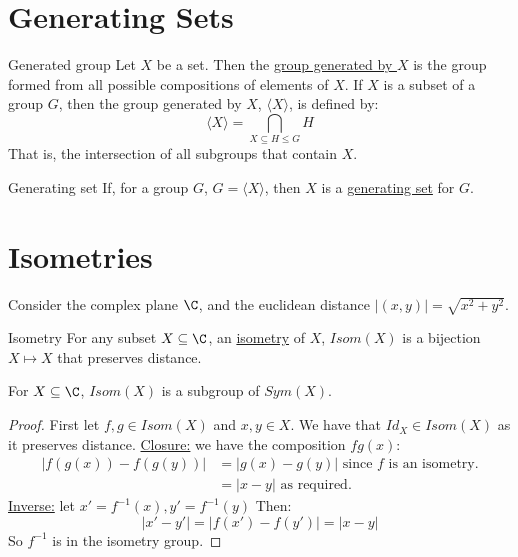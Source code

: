 \documentclass[../Main.tex]{subfiles}
\begin{document}
\section{Generating Sets}
\begin{definition}{Generated group}
    Let $X$ be a set. Then the \underline{group generated by $X$} is the group formed from all possible compositions of elements of $X$. If $X$ is a subset of a group $G$, then the group generated by $X$, $\langle X \rangle$, is defined by:
    \begin{equation*}
        \langle X \rangle = \bigcap_{X \subseteq H \leq G} H
    \end{equation*}
    That is, the intersection of all subgroups that contain $X$.
\end{definition}
\begin{definition}{Generating set}
    If, for a group $G$, $G = \langle X \rangle$, then $X$ is a \underline{generating set} for $G$.
\end{definition}
\section{Isometries}
Consider the complex plane $\C$, and the euclidean distance $|(x, y)| = \sqrt{x^2 + y^2}$.\par
\begin{definition}{Isometry}
    For any subset $X \subseteq \C$, an \underline{isometry} of $X$, $Isom(X)$ is a bijection $X \mapsto X$ that preserves distance.
\end{definition}
\begin{proposition}
    For $X \subseteq \C$, $Isom(X)$ is a subgroup of $Sym(X)$.
\end{proposition}
\begin{proof}
    First let $f, g \in Isom(X)$ and $x, y \in X$. We have that $Id_X \in Isom(X)$ as it preserves distance.
    \underline{Closure:} we have the composition $fg(x)$:
    \begin{align*}
        |f(g(x)) - f(g(y))| &= |g(x) - g(y)| \text{ since } f \text{ is an isometry.} \\
        &= |x - y| \text{ as required.}
    \end{align*}
    \underline{Inverse:} let $x' = f^{-1}(x), y' = f^{-1}(y)$ Then:
    \begin{equation*}
        |x' - y'| = |f(x') - f(y')| = |x - y|
    \end{equation*}
    So $f^{-1}$ is in the isometry group.
\end{proof}
\end{document}
